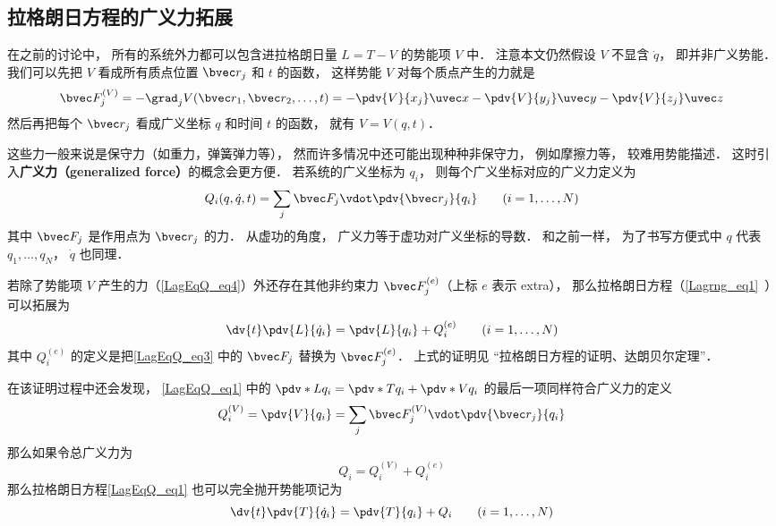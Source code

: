 

\subsection{拉格朗日方程的广义力拓展}
在之前的讨论中， 所有的系统外力都可以包含进拉格朗日量 $L = T-V$ 的势能项 $V$ 中． 注意本文仍然假设 $V$ 不显含 $\dot q$， 即并非广义势能． 我们可以先把 $V$ 看成所有质点位置 $\bvec r_j$ 和 $t$ 的函数， 这样势能 $V$ 对每个质点产生的力就是
\begin{equation}\label{LagEqQ_eq4}
\bvec F_j^{(V)} = - \grad_j V(\bvec r_1,\bvec r_2,\dots,t) = -\pdv{V}{x_j}\uvec x - \pdv{V}{y_j}\uvec y - \pdv{V}{z_j} \uvec z
\end{equation}
然后再把每个 $\bvec r_j$ 看成广义坐标 $q$ 和时间 $t$ 的函数， 就有 $V = V(q,t)$．

这些力一般来说是保守力（如重力，弹簧弹力等）， 然而许多情况中还可能出现种种非保守力， 例如摩擦力等， 较难用势能描述． 这时引入\textbf{广义力（generalized force）}的概念会更方便． 若系统的广义坐标为 $q_i$， 则每个广义坐标对应的广义力定义为
\begin{equation}\label{LagEqQ_eq3}
Q_i(q, \dot q, t) = \sum_j \bvec F_j \vdot \pdv{\bvec r_j}{q_i} \qquad (i=1,\dots,N)
\end{equation}
其中 $\bvec F_j$ 是作用点为 $\bvec r_j$ 的力． 从虚功的角度， 广义力等于虚功对广义坐标的导数． 和之前一样， 为了书写方便式中 $q$ 代表 $q_1, \dots, q_N$， $\dot q$ 也同理．

若除了势能项 $V$ 产生的力（\autoref{LagEqQ_eq4}）外还存在其他非约束力 $\bvec F_j^{(e)}$（上标 $e$ 表示 extra）， 那么拉格朗日方程（\autoref{Lagrng_eq1}~）可以拓展为
\begin{equation}\label{LagEqQ_eq1}
\dv{t} \pdv{L}{\dot q_i} = \pdv{L}{q_i} + Q_i^{(e)}
\qquad (i=1,\dots,N)
\end{equation}
其中 $Q_i^{(e)}$ 的定义是把\autoref{LagEqQ_eq3} 中的 $\bvec F_j$ 替换为 $\bvec F_j^{(e)}$． 上式的证明见 “拉格朗日方程的证明、达朗贝尔定理”．

在该证明过程中还会发现， \autoref{LagEqQ_eq1} 中的 $\pdv*{L}{q_i} = \pdv*{T}{q_i} + \pdv*{V}{q_i}$ 的最后一项同样符合广义力的定义
\begin{equation}
Q_i^{(V)} = \pdv{V}{q_i} = \sum_j \bvec F_j^{(V)} \vdot \pdv{\bvec r_j}{q_i}
\end{equation}
那么如果令总广义力为
\begin{equation}
Q_i = Q_i^{(V)} + Q_i^{(e)}
\end{equation}
那么拉格朗日方程\autoref{LagEqQ_eq1} 也可以完全抛开势能项记为
\begin{equation}\label{LagEqQ_eq2}
\dv{t} \pdv{T}{\dot q_i} = \pdv{T}{q_i} + Q_i
\qquad (i=1,\dots,N)
\end{equation}

